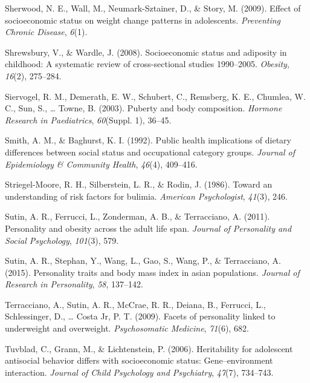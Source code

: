 \documentclass[man]{apa6}
\begin{document}
\leavevmode\hypertarget{ref-neumarkeffect}{}%
Sherwood, N. E., Wall, M., Neumark-Sztainer, D., \& Story, M. (2009). Effect of socioeconomic status on weight change patterns in adolescents. \emph{Preventing Chronic Disease}, \emph{6}(1).

\leavevmode\hypertarget{ref-shrewsbury2008socioeconomic}{}%
Shrewsbury, V., \& Wardle, J. (2008). Socioeconomic status and adiposity in childhood: A systematic review of cross-sectional studies 1990--2005. \emph{Obesity}, \emph{16}(2), 275--284.

\leavevmode\hypertarget{ref-siervogel2003puberty}{}%
Siervogel, R. M., Demerath, E. W., Schubert, C., Remsberg, K. E., Chumlea, W. C., Sun, S., \ldots{} Towne, B. (2003). Puberty and body composition. \emph{Hormone Research in Paediatrics}, \emph{60}(Suppl. 1), 36--45.

\leavevmode\hypertarget{ref-smith1992public}{}%
Smith, A. M., \& Baghurst, K. I. (1992). Public health implications of dietary differences between social status and occupational category groups. \emph{Journal of Epidemiology \& Community Health}, \emph{46}(4), 409--416.

\leavevmode\hypertarget{ref-striegel1986toward}{}%
Striegel-Moore, R. H., Silberstein, L. R., \& Rodin, J. (1986). Toward an understanding of risk factors for bulimia. \emph{American Psychologist}, \emph{41}(3), 246.

\leavevmode\hypertarget{ref-sutin2011personality}{}%
Sutin, A. R., Ferrucci, L., Zonderman, A. B., \& Terracciano, A. (2011). Personality and obesity across the adult life span. \emph{Journal of Personality and Social Psychology}, \emph{101}(3), 579.

\leavevmode\hypertarget{ref-sutin2015personality}{}%
Sutin, A. R., Stephan, Y., Wang, L., Gao, S., Wang, P., \& Terracciano, A. (2015). Personality traits and body mass index in asian populations. \emph{Journal of Research in Personality}, \emph{58}, 137--142.

\leavevmode\hypertarget{ref-terracciano2009facets}{}%
Terracciano, A., Sutin, A. R., McCrae, R. R., Deiana, B., Ferrucci, L., Schlessinger, D., \ldots{} Costa Jr, P. T. (2009). Facets of personality linked to underweight and overweight. \emph{Psychosomatic Medicine}, \emph{71}(6), 682.

\leavevmode\hypertarget{ref-tuvblad2006heritability}{}%
Tuvblad, C., Grann, M., \& Lichtenstein, P. (2006). Heritability for adolescent antisocial behavior differs with socioeconomic status: Gene--environment interaction. \emph{Journal of Child Psychology and Psychiatry}, \emph{47}(7), 734--743.
\end{document}
